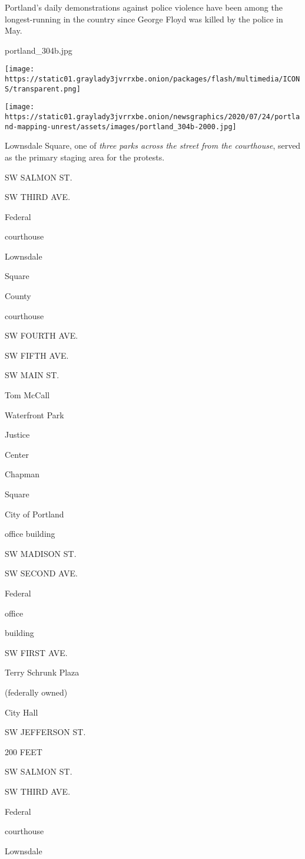 Portland's daily demonstrations against police violence have been among
the longest-running in the country since George Floyd was killed by the
police in May.

portland\_304b.jpg

\texttt{[image: https://static01.graylady3jvrrxbe.onion/packages/flash/multimedia/ICONS/transparent.png]}

\texttt{[image: https://static01.graylady3jvrrxbe.onion/newsgraphics/2020/07/24/portland-mapping-unrest/assets/images/portland\_304b-2000.jpg]}

Lownsdale Square, one of \emph{three parks across the street from the
courthouse}, served as the primary staging area for the protests.

SW SALMON ST.

SW THIRD AVE.

Federal

courthouse

Lownsdale

Square

County

courthouse

SW FOURTH AVE.

SW FIFTH AVE.

SW MAIN ST.

Tom McCall

Waterfront Park

Justice

Center

Chapman

Square

City of Portland

office building

SW MADISON ST.

SW SECOND AVE.

Federal

office

building

SW FIRST AVE.

Terry Schrunk Plaza

(federally owned)

City Hall

SW JEFFERSON ST.

200 FEET

SW SALMON ST.

SW THIRD AVE.

Federal

courthouse

Lownsdale

